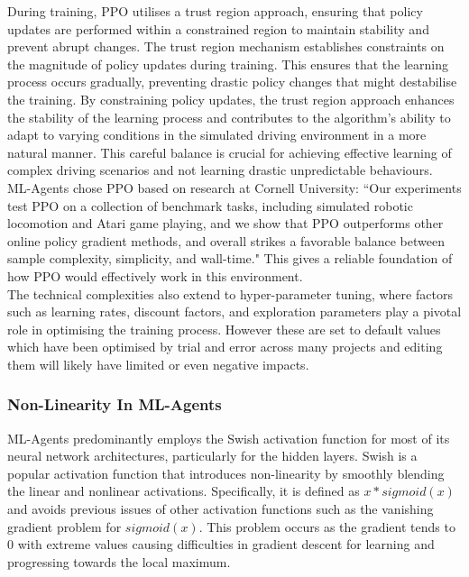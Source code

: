 \documentclass{article}
\begin{document}
 During training, PPO utilises a trust region approach, ensuring that policy updates are performed within a constrained region to maintain stability and prevent abrupt changes. The trust region mechanism establishes constraints on the magnitude of policy updates during training. This ensures that the learning process occurs gradually, preventing drastic policy changes that might destabilise the training. By constraining policy updates, the trust region approach enhances the stability of the learning process and contributes to the algorithm's ability to adapt to varying conditions in the simulated driving environment in a more natural manner. This careful balance is crucial for achieving effective learning of complex driving scenarios and not learning drastic unpredictable behaviours.\\

 ML-Agents chose PPO based on research at Cornell University: ``Our experiments test PPO on a collection of benchmark tasks, including simulated robotic locomotion and Atari game playing, and we show that PPO outperforms other online policy gradient methods, and overall strikes a favorable balance between sample complexity, simplicity, and wall-time." \cite{PPO-Algorithms} This gives a reliable foundation of how PPO would effectively work in this environment.\\

 The technical complexities also extend to hyper-parameter tuning, where factors such as learning rates, discount factors, and exploration parameters play a pivotal role in optimising the training process. However these are set to default values which have been optimised by trial and error across many projects and editing them will likely have limited or even negative impacts.

\subsubsection{Non-Linearity In ML-Agents}
ML-Agents predominantly employs the Swish activation function for most of its neural network architectures, particularly for the hidden layers. Swish is a popular activation function that introduces non-linearity by smoothly blending the linear and nonlinear activations. Specifically, it is defined as $x*sigmoid(x)$ and avoids previous issues of other activation functions such as the vanishing gradient problem for $sigmoid(x)$. This problem occurs as the gradient tends to 0 with extreme values causing difficulties in gradient descent for learning and progressing towards the local maximum.\\ 
\end{document}
